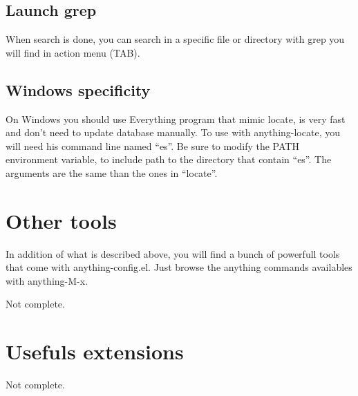 \documentclass[a4paper,11pt]{article}
\begin{document}
\subsection{Launch grep}
\label{sec:launch-grep}

When search is done, you can search in a specific file or directory with grep you will find in action menu (TAB).

\subsection{Windows specificity}
\label{sec:windows-specificity}

On Windows you should use Everything program that mimic locate, is very fast and don't need to
update database manually.
To use with anything-locate, you will need his command line named ``es''.
Be sure to modify the PATH environment variable, to include path to the directory that contain ``es''.
The arguments are the same than the ones in ``locate''.


\section{Other tools}
\label{sec:other-tools}

In addition of what is described above, you will find a bunch of powerfull tools that come with anything-config.el.
Just browse the anything commands availables with anything-M-x.

Not complete.
\section{Usefuls extensions}
\label{sec:usefuls-extensions}
Not complete.
\end{document}
